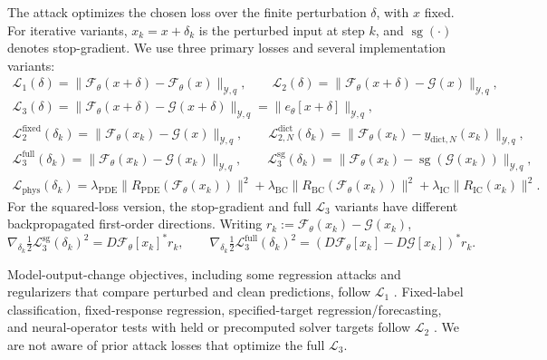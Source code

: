 \documentclass{article}
\begin{document}
The attack optimizes the chosen loss over the finite perturbation $\delta$,
with $x$ fixed. For iterative variants, $x_k=x+\delta_k$ is the perturbed input
at step $k$, and $\operatorname{sg}(\cdot)$ denotes stop-gradient. We use
three primary losses and several implementation variants:
\begin{equation*}
\begin{gathered}
\mathcal{L}_1(\delta)=\|\mathcal{F}_\theta(x+\delta)-\mathcal{F}_\theta(x)\|_{\mathcal{Y},q},\qquad
\mathcal{L}_2(\delta)=\|\mathcal{F}_\theta(x+\delta)-\mathcal{G}(x)\|_{\mathcal{Y},q},\\
\mathcal{L}_3(\delta)=\|\mathcal{F}_\theta(x+\delta)-\mathcal{G}(x+\delta)\|_{\mathcal{Y},q}=\|e_\theta[x+\delta]\|_{\mathcal{Y},q},\\
\mathcal{L}_2^{\mathrm{fixed}}(\delta_k)=\|\mathcal{F}_\theta(x_k)-\mathcal{G}(x)\|_{\mathcal{Y},q},\qquad
\mathcal{L}_{2,N}^{\mathrm{dict}}(\delta_k)=\|\mathcal{F}_\theta(x_k)-y_{\mathrm{dict},N}(x_k)\|_{\mathcal{Y},q},\\
\mathcal{L}_3^{\mathrm{full}}(\delta_k)=\|\mathcal{F}_\theta(x_k)-\mathcal{G}(x_k)\|_{\mathcal{Y},q},\qquad
\mathcal{L}_3^{\mathrm{sg}}(\delta_k)=\|\mathcal{F}_\theta(x_k)-\operatorname{sg}(\mathcal{G}(x_k))\|_{\mathcal{Y},q},\\
\mathcal{L}_{\mathrm{phys}}(\delta_k)=\lambda_{\mathrm{PDE}}\|R_{\mathrm{PDE}}(\mathcal{F}_\theta(x_k))\|^2+\lambda_{\mathrm{BC}}\|R_{\mathrm{BC}}(\mathcal{F}_\theta(x_k))\|^2+\lambda_{\mathrm{IC}}\|R_{\mathrm{IC}}(x_k)\|^2.
\end{gathered}
\end{equation*}
For the squared-loss version, the stop-gradient and full $\mathcal{L}_3$
variants have different backpropagated first-order directions. Writing
$r_k:=\mathcal{F}_\theta(x_k)-\mathcal{G}(x_k)$,
\begin{equation*}
\nabla_{\delta_k}\tfrac{1}{2}\mathcal{L}_3^{\mathrm{sg}}(\delta_k)^2=D\mathcal{F}_\theta[x_k]^*r_k,\qquad
\nabla_{\delta_k}\tfrac{1}{2}\mathcal{L}_3^{\mathrm{full}}(\delta_k)^2=(D\mathcal{F}_\theta[x_k]-D\mathcal{G}[x_k])^*r_k.
\end{equation*}

Model-output-change objectives, including some regression attacks and
regularizers that compare perturbed and clean predictions, follow
$\mathcal{L}_1$
\citep{nguyen2018regression,mode2020mtsregression,liu2022forecastingattacks}.
Fixed-label classification, fixed-response regression, specified-target
regression/forecasting, and neural-operator tests with held or precomputed
solver targets follow $\mathcal{L}_2$
\citep{goodfellow2015explaining,madry2018towards,tong2018adversarialregression,ribeiro2023linearregression,liu2022forecastingattacks,adesoji2022evaluating}.
We are not aware of prior attack losses that optimize the full
$\mathcal{L}_3$.
\end{document}
